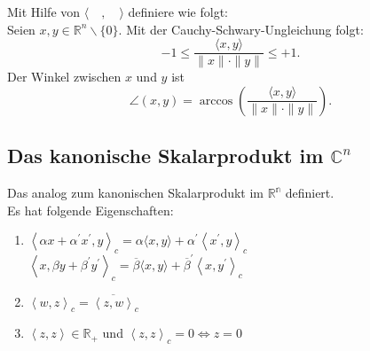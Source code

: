 \documentclass[11pt, a4paper]{article}
\begin{document}
\begin{definition}
Mit Hilfe von $\langle\quad, \quad\rangle$ definiere  wie folgt:
\\Seien $x, y \in \mathbb{R}^n\backslash \{0\} $. Mit der Cauchy-Schwary-Ungleichung folgt: 
\begin{equation*}
-1 \leq \frac{\langle x, y\rangle}{\|x\| \cdot\|y\|} \leq+1.
\end{equation*}
Der Winkel zwischen $x$ und $y$ ist 
\begin{equation*}
\angle(x, y) = \arccos\left(\frac{\langle x, y\rangle}{\|x\| \cdot\|y\|}\right).
\end{equation*}
\end{definition}

\subsection{Das kanonische Skalarprodukt im $\mathbb{C}^n$}
\begin{definition}
Das  analog zum kanonischen Skalarprodukt im $\mathbb{R^n}$ definiert. 
\\Es hat folgende Eigenschaften:
\begin{enumerate}
\item {} $\left\langle \alpha x+ \alpha^{\prime} x^{\prime}, y\right\rangle_c=\alpha \langle x, y\rangle+ \alpha^{\prime}\left\langle x^{\prime}, y\right\rangle_c $
\\$\left\langle x, \beta y+ \beta^{\prime} y^{\prime}\right\rangle_c=\overline{\beta} \langle x, y\rangle+ \overline{\beta}^{\prime}\left\langle x, y^{\prime}\right\rangle_c $
\item {} $\left\langle w, z \right\rangle_c = \overline{\left\langle z, w \right\rangle}_c$
\item {} $\left\langle z, z \right\rangle \in \mathbb{R}_+$ und $\left\langle z, z\right\rangle_c = 0 \Leftrightarrow z = 0$
\end{enumerate}
\end{definition}
\end{document}
